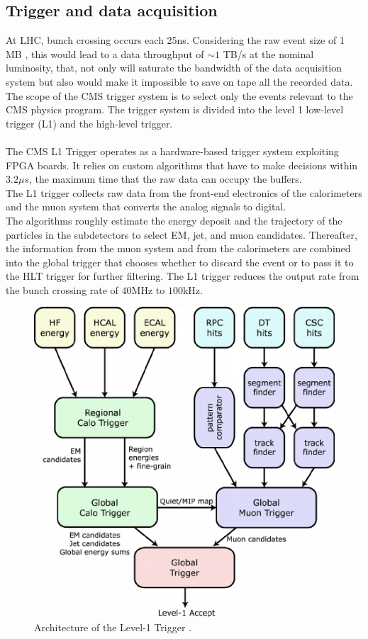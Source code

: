 \subsection{Trigger and data acquisition}
At LHC, bunch crossing occurs each 25ns. Considering the raw event size of 1 MB \cite{Franzoni2016DatasetAnalyses}, this would lead to a data throughput of  $\sim 1$ TB/s at the nominal luminosity, that, not only will saturate the bandwidth of the data acquisition system but also would make it impossible to save on tape all the recorded data.\\
The scope of the CMS trigger system is to select only the events relevant to the CMS physics program.
The trigger system is divided into the level 1 low-level trigger (L1) and the high-level trigger.\\
\\
The CMS L1 Trigger \cite{Musenich2000CMSSystems} operates as a hardware-based trigger system exploiting FPGA boards. It relies on custom algorithms that have to make decisions within $3.2 \mu s$, the maximum time that the raw data can occupy the buffers.\\
The L1 trigger collects raw data from the front-end electronics of the calorimeters and the muon system that converts the analog signals to digital.\\
The algorithms roughly estimate the energy deposit and the trajectory of the particles in the subdetectors to select EM, jet, and muon candidates. Thereafter, the information from the muon system and from the calorimeters are combined into the global trigger that chooses whether to discard the event or to pass it to the HLT trigger for further filtering.
The L1 trigger reduces the output rate from the bunch crossing rate of $40$MHz to $100$kHz.
\\
\begin{figure}[h!]
    \centering
    \includegraphics[width=0.6\linewidth]{fig/chap03-cms/L1.png}
    \caption{Architecture of the Level-1 Trigger \cite{Brooke2003HardwareTrigger}.}
    \label{fig:l1}
\end{figure}
